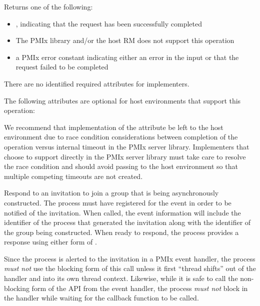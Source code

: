 Returns one of the following:

\begin{itemize}
    \item {}, indicating that the request has been successfully completed
    \item {} The \ac{PMIx} library and/or the host \ac{RM} does not support this operation
    \item a \ac{PMIx} error constant indicating either an error in the input or that the request failed to be completed
\end{itemize}

\reqattrstart
There are no identified required attributes for implementers.

\reqattrend

\optattrstart
The following attributes are optional for host environments that support this operation:


\optattrend

\adviceimplstart
We recommend that implementation of the  attribute be left to the host environment due to race condition considerations between completion of the operation versus internal timeout in the \ac{PMIx} server library. Implementers that choose to support  directly in the \ac{PMIx} server library must take care to resolve the race condition and should avoid passing  to the host environment so that multiple competing timeouts are not created.
\adviceimplend


\descr

Respond to an invitation to join a group that is being asynchronously constructed. The process must have registered for the  event in order to be notified of the invitation. When called, the event information will include the  identifier of the process that generated the invitation along with the identifier of the group being constructed. When ready to respond, the process provides a response using either form of .

\adviceuserstart
Since the process is alerted to the invitation in a \ac{PMIx} event handler, the process \emph{must not} use the blocking form of this call unless it first ``thread shifts'' out of the handler and into its own thread context. Likewise, while it is safe to call the non-blocking form of the \ac{API} from the event handler, the process \emph{must not} block in the handler while waiting for the callback function to be called.
\adviceuserend

